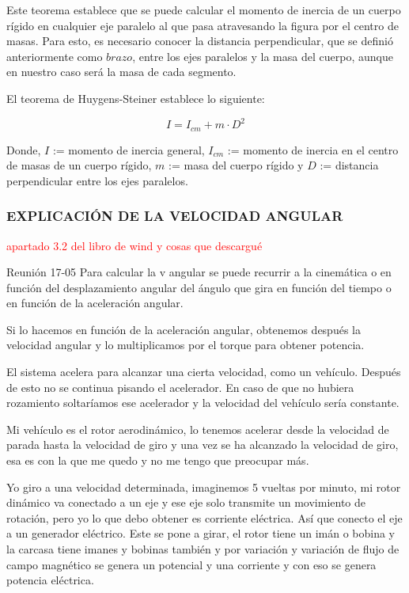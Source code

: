 Este teorema establece que se puede calcular el momento de inercia de un cuerpo rígido en cualquier eje paralelo al que pasa atravesando la figura por el centro de masas. Para esto, es necesario conocer la distancia perpendicular, que se definió anteriormente como $brazo$, entre los ejes paralelos y la masa del cuerpo, aunque en nuestro caso será la masa de cada segmento. \\


 \begin{Teorema}
El teorema de Huygens-Steiner establece lo siguiente:

$$I = I_{cm} + m \cdot D^2$$

 Donde, $I$ := momento de inercia general, $I_{cm}$ := momento de inercia en el centro de masas de un cuerpo rígido, $m$ := masa del cuerpo rígido y $D$ := distancia perpendicular entre los ejes paralelos.
 \centering 
 \label{theo:Huygens-Steiner}
 \end{Teorema}






 
\subsubsection{EXPLICACIÓN DE LA VELOCIDAD ANGULAR}

\textcolor{red}{apartado 3.2 del libro de wind y cosas que descargué}

Reunión 17-05
Para calcular la v angular se puede recurrir a la cinemática o en función del desplazamiento angular del ángulo que gira en función del tiempo o en función de la aceleración angular.

Si lo hacemos en función de la aceleración angular, obtenemos después la velocidad angular y lo multiplicamos por el torque para obtener potencia.

El sistema acelera para alcanzar una cierta velocidad, como un vehículo. Después de esto no se continua pisando el acelerador. En caso de que no hubiera rozamiento soltaríamos ese acelerador y la velocidad del vehículo sería constante.

Mi vehículo es el rotor aerodinámico, lo tenemos acelerar desde la velocidad de parada hasta la velocidad de giro y una vez se ha alcanzado la velocidad de giro, esa es con la que me quedo y no me tengo que preocupar más.

Yo giro a una velocidad determinada, imaginemos 5 vueltas por minuto, mi rotor dinámico va conectado a un eje y ese eje solo transmite un movimiento de rotación, pero yo lo que debo obtener es corriente eléctrica. Así que conecto el eje a un generador eléctrico. Este se pone a girar, el rotor tiene un imán o bobina y la carcasa tiene imanes y bobinas también y por variación y variación de flujo de campo magnético se genera un potencial y una corriente y con eso se genera potencia eléctrica.

